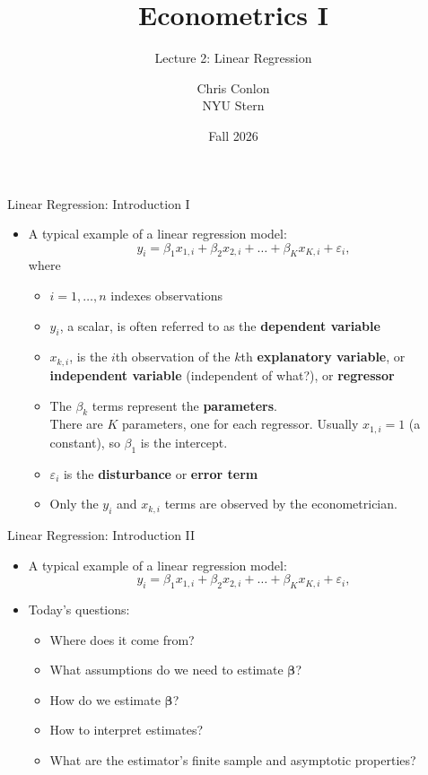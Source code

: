 \documentclass[aspectratio=169,11pt]{beamer}
\title[L3 - Linear Regression]{ Econometrics I}
\subtitle{Lecture 2: Linear Regression}
\author{Chris Conlon \\NYU Stern}
\date{Fall 2026}
\begin{document}
\maketitle



\begin{frame}{Linear Regression: Introduction I}
\begin{itemize}
	\item A typical example of a linear regression model:
	\begin{equation*}
		y_i = \beta_1 x_{1,i} +  \beta_2 x_{2,i} + \dots +  \beta_K x_{K,i} + \varepsilon_i,
	\end{equation*}
	where 
	\begin{itemize}
		\item<1-> $i=1,\dots,n$ indexes observations
		\smallskip
		\item<2-> $y_{i}$, a scalar, is often referred to as the {\bf dependent variable}
		\smallskip
		\item<3-> $x_{k,i}$, is the $i$th observation of the $k$th {\bf explanatory variable},
		 or {\bf independent variable} (independent of what?), or  {\bf regressor}
		\smallskip
		\item<4-> The $\beta_{k}$ terms represent the {\bf  parameters}. \\
		There are $K$ parameters, one	for each regressor. Usually $x_{1,i}=1$ (a constant), so $\beta_1$ is the intercept.

		\smallskip
		\item<5-> $\varepsilon_{i}$ is the {\bf disturbance} or {\bf error term}
\smallskip
		\item<6-> Only the $y_{i}$ and $x_{k,i}$ terms are observed by the econometrician.
	\end{itemize}
\end{itemize}
\end{frame}


\begin{frame}{Linear Regression: Introduction II}
\begin{itemize}
	\item A typical example of a linear regression model:
	\begin{equation*}
		y_i = \beta_1 x_{1,i} +  \beta_2 x_{2,i} + \dots +  \beta_K x_{K,i} + \varepsilon_i,
	\end{equation*}
	\item Today's questions: 
	\begin{itemize}
		\item Where does it come from? 
		\item What assumptions do we need to estimate $\boldsymbol{\beta}$?
		\item How do we estimate $\boldsymbol{\beta}$?
		\item How to interpret estimates? 
		\item What are the estimator's finite sample and asymptotic properties? 
	\end{itemize}
\end{itemize}
\end{frame}
\end{document}
